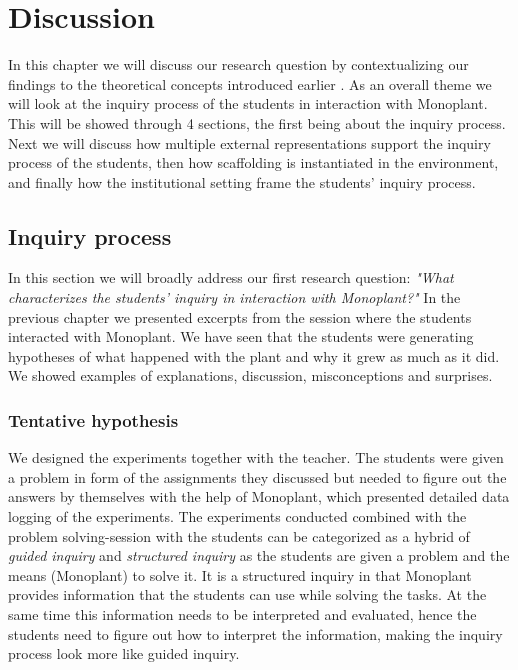 \chapter{Discussion}
In this chapter we will discuss our research question by contextualizing our findings to the theoretical concepts introduced earlier . As an overall theme we will look at the inquiry process of the students in interaction with Monoplant. This will be showed through 4 sections, the first being about the inquiry process. Next we will discuss how multiple external representations support the inquiry process of the students, then how scaffolding is instantiated in the environment, and finally how the institutional setting frame the students' inquiry process.


\section{Inquiry process}
In this section we will broadly address our first research question: \emph{"What characterizes the students’ inquiry in interaction with Monoplant?"}
In the previous chapter we presented excerpts from the session where the students interacted with Monoplant. We have seen that the students were generating hypotheses of what happened with the plant and why it grew as much as it did. We showed examples of explanations, discussion, misconceptions and surprises.

\subsection{Tentative hypothesis}
We designed the experiments together with the teacher. The students were given a problem in form of the assignments they discussed but needed to figure out the answers by themselves with the help of Monoplant, which presented detailed data logging of the experiments. The experiments conducted combined with the problem solving-session with the students can be categorized as a hybrid of \emph{guided inquiry} and \emph{structured inquiry} \citetext{\citet{staver1987analysis}, referenced in \citealp{prince2006inductive}} as the students are given a problem and the means (Monoplant) to solve it. It is a structured inquiry in that Monoplant provides information that the students can use while solving the tasks. At the same time this information needs to be interpreted and evaluated, hence the students need to figure out how to interpret the information, making the inquiry process look more like guided inquiry.


